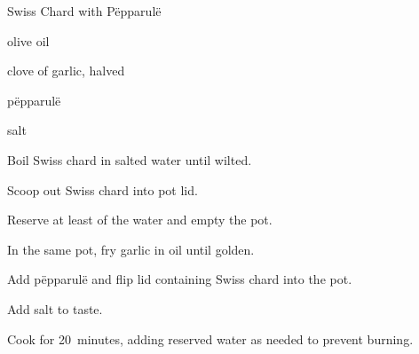 \begin{recipe}{Swiss Chard with P\"epparul\"e}{}{}

\begin{ingredients}
\item {}
\item olive oil
\item clove of garlic, halved
\item p\"epparul\"e
\item salt
\end{ingredients}

\begin{directions}
\item Boil Swiss chard in salted water until wilted.
\item Scoop out Swiss chard into pot lid.
\item Reserve at least  of the water and empty the pot.
\item In the same pot, fry garlic in oil until golden.
\item Add p\"epparul\"e and flip lid containing Swiss chard into the pot.
\item Add salt to taste.
\item Cook for 20~minutes, adding reserved water as needed to prevent burning.
\end{directions}

\end{recipe}
